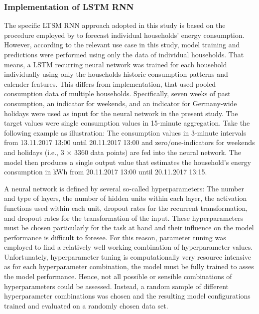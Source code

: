\subsubsection{Implementation of LSTM RNN}

The specific LTSM RNN approach adopted in this study is based on the procedure employed by \citet{Shi:2017} to forecast individual households' energy consumption. However, according to the relevant use case in this study, model training and predictions were performed using only the data of individual households. That means, a LSTM recurring neural network was trained for each household individually using only the households historic consumption patterns and calender features. This differs from \cites{Shi:2017} implementation, that used pooled consumption data of multiple households. Specifically, seven weeks of past consumption, an indicator for weekends, and an indicator for Germany-wide holidays were used as input for the neural network in the present study. The target values were single consumption values in 15-minute aggregation. Take the following example as illustration: The consumption values in 3-minute intervals from 13.11.2017 13:00 until 20.11.2017 13:00 and zero/one-indicators for weekends and holidays (i.e., 3 $\times$ 3360 data points) are fed into the neural network. The model then produces a single output value that estimates the household's energy consumption in kWh from 20.11.2017 13:00 until 20.11.2017 13:15.

A neural network is defined by several so-called hyperparameters: The number and type of layers, the number of hidden units within each layer, the activation functions used within each unit, dropout rates for the recurrent transformation, and dropout rates for the transformation of the input. These hyperparameters must be chosen particularly for the task at hand and their influence on the model performance is difficult to foresee. For this reason, parameter tuning was employed to find a relatively well working combination of hyperparameter values. Unfortunately, hyperparameter tuning is computationally very resource intensive as for each hyperparameter combination, the model must be fully trained to asses the model performance. Hence, not all possible or sensible combinations of hyperparameters could be assessed. Instead, a random sample of different hyperparameter combinations was chosen and the resulting model configurations trained and evaluated on a randomly chosen data set.

